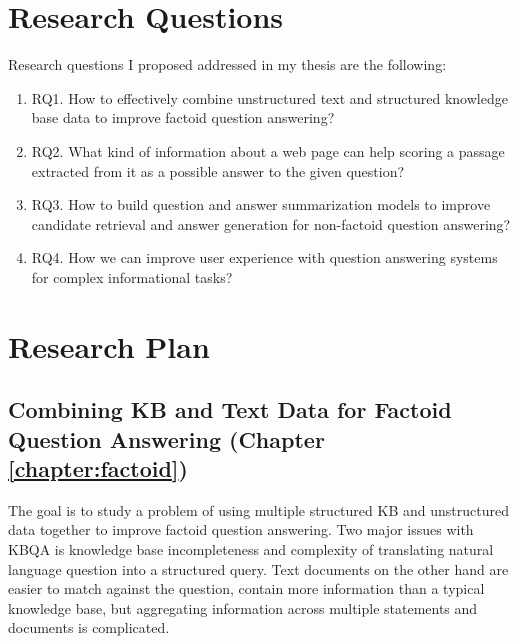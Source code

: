 \section{Research Questions}

Research questions I proposed addressed in my thesis are the following:

\begin{enumerate}
\item RQ1. How to effectively combine unstructured text and structured knowledge base data to improve factoid question answering?
\item RQ2. What kind of information about a web page can help scoring a passage extracted from it as a possible answer to the given question?
\item RQ3. How to build question and answer summarization models to improve candidate retrieval and answer generation for non-factoid question answering?
\item RQ4. How we can improve user experience with question answering systems for complex informational tasks?
\end{enumerate}


\section{Research Plan}

\subsection{Combining KB and Text Data for Factoid Question Answering (Chapter \ref{chapter:factoid})}
\label{sec:plan1}

The goal is to study a problem of using multiple structured KB and unstructured data together to improve factoid question answering.
Two major issues with KBQA is knowledge base incompleteness and complexity of translating natural language question into a structured query.
Text documents on the other hand are easier to match against the question, contain more information than a typical knowledge base, but aggregating information across multiple statements and documents is complicated.

